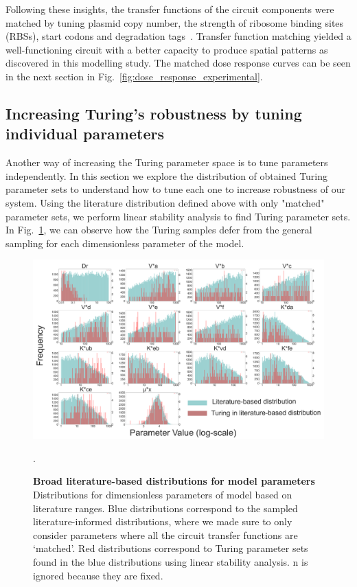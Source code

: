 Following these insights, the transfer functions of the circuit components were matched by tuning plasmid copy number, the strength of ribosome binding sites (RBSs), start codons and degradation tags~\parencite{Andersen1998, Wang2011,Hecht2017}.
Transfer function matching yielded a well-functioning circuit with a better capacity to produce spatial patterns as discovered in this modelling study.
The matched dose response curves can be seen in the next section in Fig.~\ref{fig:dose_response_experimental}.


\subsection{Increasing Turing's robustness by tuning individual parameters}
Another way of increasing the Turing parameter space is to tune parameters independently.
In this section we explore the distribution of obtained Turing parameter sets to understand how to tune each one to increase robustness of our system.
Using the literature distribution defined above with only "matched" parameter sets, we perform linear stability analysis to find Turing parameter sets.
In Fig.~\ref{fig:param_distributions_turing_vs_noturing}, we can observe how the Turing samples defer from the general sampling for each dimensionless parameter of the model.

\begin{figure}[H] %
    \centering
    \begin{adjustbox}{center}
        \includegraphics[width=1.2\textwidth]{chapters/Chapter 2/param_distributions} %
    \end{adjustbox}
    \caption{\textbf{Broad literature-based distributions for model parameters} Distributions for dimensionless parameters of model based on literature ranges. Blue distributions correspond to the sampled literature-informed distributions, where we made sure to only consider parameters where all the circuit transfer functions are ‘matched’. Red distributions correspond to Turing parameter sets found in the blue distributions using linear stability analysis. n is ignored because they are fixed. }. %
    \label{fig:param_distributions_turing_vs_noturing} %
\end{figure}

